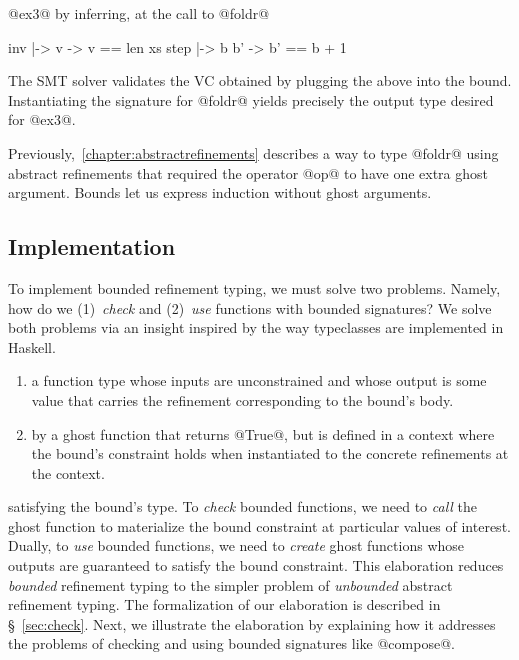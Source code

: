  @ex3@ by inferring, at the call to @foldr@
%
\begin{code}
  inv  |-> \xs v   -> v  == len xs
  step |-> \x b b' -> b' == b + 1
\end{code}
%
The SMT solver validates the VC obtained by plugging the
above into the bound.
%
Instantiating the signature for @foldr@ yields precisely the
output type desired for @ex3@.

Previously,~\ref{chapter:abstractrefinements} describes a way to type @foldr@
using abstract refinements that required the operator @op@
to have one extra ghost argument.
Bounds let us express induction without ghost arguments.

\subsection{Implementation}\label{sec:overview:implementation}

To implement bounded refinement typing, we must solve two
problems. Namely, how do we
%
(1)~\emph{check} and
%
(2)~\emph{use}
%
functions with bounded signatures?
%
We solve both problems via an insight inspired
by the way typeclasses are implemented in Haskell.
%
\begin{enumerate}
%
\item {} a function type
whose inputs are unconstrained and whose output is
some value that carries the refinement corresponding
to the bound's body.
%
\item {} by a ghost
function that returns @True@, but is defined
in a context where the bound's constraint holds when
instantiated to the concrete refinements at the context.
%
\end{enumerate}

 satisfying
the bound's type.
%
To \emph{check} bounded functions, we need to
\emph{call} the ghost function to materialize the
bound constraint at particular values of interest.
%
Dually, to \emph{use} bounded functions, we need to
\emph{create} ghost functions whose outputs are
guaranteed to satisfy the bound constraint.
%
This elaboration reduces \emph{bounded} refinement
typing to the simpler problem
of \emph{unbounded} abstract refinement typing.
%
The formalization of our elaboration is described in
\S~\ref{sec:check}.
%
Next, we illustrate the elaboration by explaining how
it addresses the problems of checking and using bounded
signatures like @compose@.

